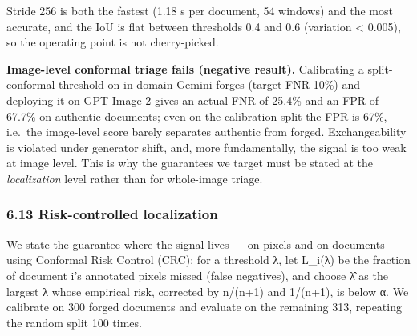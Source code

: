 Stride 256 is both the fastest (1.18 s per document, 54 windows) and the most accurate, and the IoU is flat between thresholds 0.4 and 0.6 (variation \textless{} 0.005), so the operating point is not cherry-picked.

\textbf{Image-level conformal triage fails (negative result).} Calibrating a split-conformal threshold on in-domain Gemini forges (target FNR 10\%) and deploying it on GPT-Image-2 gives an actual FNR of 25.4\% and an FPR of 67.7\% on authentic documents; even on the calibration split the FPR is 67\%, i.e.~the image-level score barely separates authentic from forged. Exchangeability is violated under generator shift, and, more fundamentally, the signal is too weak at image level. This is why the guarantees we target must be stated at the \emph{localization} level rather than for whole-image triage.

\subsubsection{6.13 Risk-controlled localization}\label{risk-controlled-localization}

We state the guarantee where the signal lives --- on pixels and on documents --- using Conformal Risk Control (CRC): for a threshold λ, let L\_i(λ) be the fraction of document i's annotated pixels missed (false negatives), and choose λ̂ as the largest λ whose empirical risk, corrected by n/(n+1) and 1/(n+1), is below α. We calibrate on 300 forged documents and evaluate on the remaining 313, repeating the random split 100 times.

